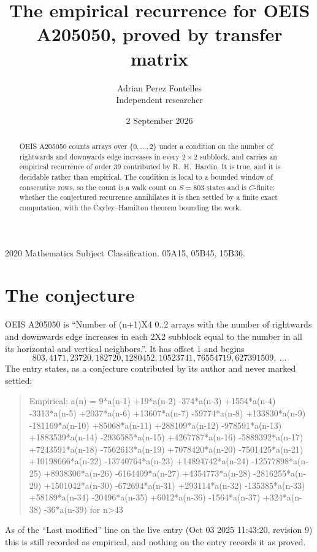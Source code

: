 \documentclass[11pt,a4paper]{article}
\title{The empirical recurrence for OEIS A205050, proved by transfer matrix}
\author{Adrian Perez Fontelles\\ \small Independent researcher}
\date{2 September 2026}
\theoremstyle{plain}
\theoremstyle{definition}
\begin{document}
\maketitle

\begin{abstract}
OEIS A205050 counts arrays over $\{0,\dots,2\}$ under a condition on the number of rightwards and downwards edge increases
in every $2\times2$ subblock, and carries an empirical recurrence of order $39$ contributed by
R.~H.~Hardin. It is true, and it is decidable rather than empirical. The condition is local to
a bounded window of consecutive rows, so the count is a walk count on $S=803$ states and is
$C$-finite; whether the conjectured recurrence annihilates it is then settled by a finite exact
computation, with the Cayley--Hamilton theorem bounding the work.
\end{abstract}

\noindent\small 2020 Mathematics Subject Classification. 05A15, 05B45, 15B36.\normalsize

\section{The conjecture}

OEIS A205050 is ``Number of (n+1)X4 0..2 arrays with the number of rightwards and downwards edge increases in each 2X2 subblock equal to the number in all its horizontal and vertical neighbors.''. It has offset $1$ and begins
\[
803, 4171, 23720, 182720, 1280452, 10523741, 76554719, 627391509,\ \dots
\]
The entry states, as a conjecture contributed by its author and never marked settled:
\begin{quote}
Empirical: a(n) = 9*a(n-1) +19*a(n-2) -374*a(n-3) +1554*a(n-4) -3313*a(n-5) +2037*a(n-6) +13607*a(n-7) -59774*a(n-8) +133830*a(n-9) -181169*a(n-10) +85068*a(n-11) +288109*a(n-12) -978591*a(n-13) +1883539*a(n-14) -2936585*a(n-15) +4267787*a(n-16) -5889392*a(n-17) +7243591*a(n-18) -7562613*a(n-19) +7078420*a(n-20) -7501425*a(n-21) +10198666*a(n-22) -13740764*a(n-23) +14894742*a(n-24) -12577898*a(n-25) +8938306*a(n-26) -6164409*a(n-27) +4354773*a(n-28) -2816255*a(n-29) +1501042*a(n-30) -672694*a(n-31) +293114*a(n-32) -135385*a(n-33) +58189*a(n-34) -20496*a(n-35) +6012*a(n-36) -1564*a(n-37) +324*a(n-38) -36*a(n-39) for n>43
\end{quote}
As of the ``Last modified'' line on the live entry (Oct 03 2025 11:43:20, revision 9) this is still
recorded as empirical, and nothing on the entry records it as proved.
\end{document}
